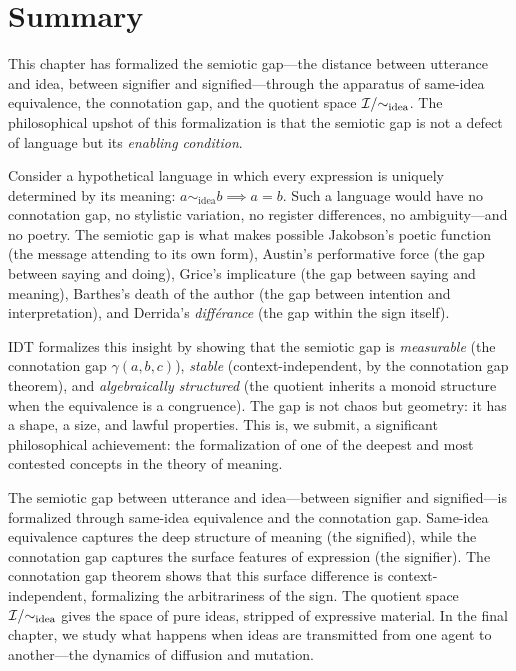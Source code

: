 \section{Summary}

\begin{interpretation}\label{interp:ch6:gap_condition_meaning}
This chapter has formalized the semiotic gap---the distance between
utterance and idea, between signifier and signified---through the
apparatus of same-idea equivalence, the connotation gap, and the
quotient space $\mathcal{I} / {\sim_{\text{idea}}}$. The philosophical
upshot of this formalization is that the semiotic gap is not a defect
of language but its \emph{enabling condition}.

Consider a hypothetical language in which every expression is uniquely
determined by its meaning: $a \sim_{\text{idea}} b \implies a = b$.
Such a language would have no connotation gap, no stylistic variation,
no register differences, no ambiguity---and no poetry. The semiotic
gap is what makes possible Jakobson's poetic function (the message
attending to its own form), Austin's performative force (the gap between
saying and doing), Grice's implicature (the gap between saying and
meaning), Barthes's death of the author (the gap between intention and
interpretation), and Derrida's \emph{diff\'erance} (the gap within
the sign itself).

IDT formalizes this insight by showing that the semiotic gap is
\emph{measurable} (the connotation gap $\gamma(a, b, c)$),
\emph{stable} (context-independent, by the connotation gap theorem),
and \emph{algebraically structured} (the quotient inherits a monoid
structure when the equivalence is a congruence). The gap is not chaos
but geometry: it has a shape, a size, and lawful properties. This
is, we submit, a significant philosophical achievement: the
formalization of one of the deepest and most contested concepts in
the theory of meaning.
\end{interpretation}

The semiotic gap between utterance and idea---between signifier and
signified---is formalized through same-idea equivalence and the
connotation gap. Same-idea equivalence captures the deep structure of
meaning (the signified), while the connotation gap captures the surface
features of expression (the signifier). The connotation gap theorem shows
that this surface difference is context-independent, formalizing the
arbitrariness of the sign. The quotient space $\mathcal{I} / {\sim_{\mathrm{idea}}}$
gives the space of pure ideas, stripped of expressive material. In the
final chapter, we study what happens when ideas are transmitted from one
agent to another---the dynamics of diffusion and mutation.


